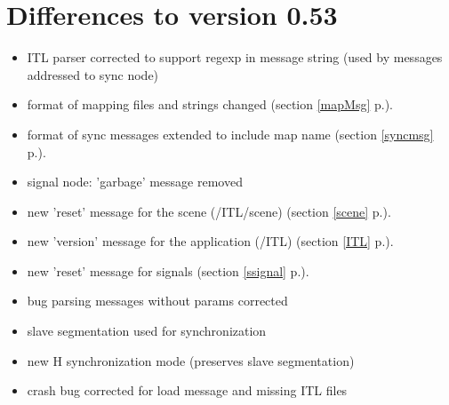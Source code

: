 \documentclass[a4paper,twoside]{report}
\newcommand{\sublevel}[1]	{\section{#1}}
\newcommand{\fullref}[1]	{\ref{#1} p.\pageref{#1}}
\begin{document}
\sublevel{Differences to version 0.53}
\begin{itemize}
\item ITL parser corrected to support regexp in message string (used by messages addressed to sync node)
\item format of mapping files and strings changed (section \fullref{mapMsg}).
\item format of sync messages extended to include map name (section \fullref{syncmsg}).
\item signal node: 'garbage' message removed
\item new 'reset' message for the scene (/ITL/scene) (section \fullref{scene}).
\item new 'version' message for the application (/ITL) (section \fullref{ITL}).
\item new 'reset' message for signals (section \fullref{ssignal}).
\item bug parsing messages without params corrected
\item slave segmentation used for synchronization
\item new H synchronization mode (preserves slave segmentation)
\item crash bug corrected for load message and missing ITL files
\end{itemize}
\end{document}
